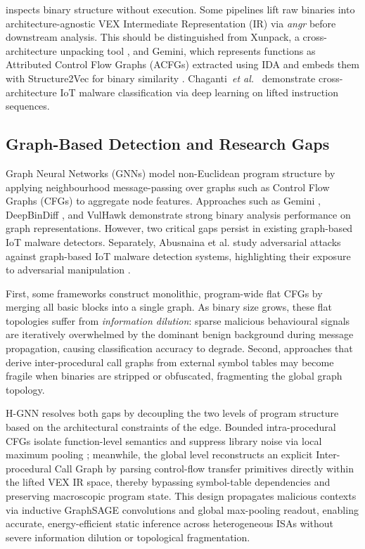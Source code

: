 \documentclass{llncs}
\begin{document}
 inspects binary structure without
execution. Some pipelines lift raw binaries into architecture-agnostic
VEX Intermediate Representation (IR) via \textit{angr} before downstream
analysis.
This should be distinguished from Xunpack, a cross-architecture
unpacking tool \cite{b4}, and Gemini, which represents functions as
Attributed Control Flow Graphs (ACFGs) extracted using IDA and embeds them
with Structure2Vec for binary similarity \cite{b8}.
Chaganti~\textit{et al.}~\cite{b5} demonstrate cross-architecture
IoT malware classification via deep learning on lifted instruction
sequences.

\subsection{Graph-Based Detection and Research Gaps}

Graph Neural Networks (GNNs) model non-Euclidean program
structure by applying neighbourhood message-passing over graphs such as
Control Flow Graphs (CFGs) to aggregate node features.
Approaches such as Gemini \cite{b8}, DeepBinDiff \cite{b9}, and VulHawk
\cite{b10} demonstrate strong binary analysis performance on
graph representations. However, two critical gaps persist
in existing graph-based IoT malware detectors.
Separately, Abusnaina et al. study adversarial attacks against
graph-based IoT malware detection systems, highlighting their exposure to
adversarial manipulation \cite{b6}.

First, some frameworks construct monolithic, program-wide
flat CFGs by merging all basic blocks into a single graph.
As binary size grows, these flat topologies suffer
from \textit{information dilution}: sparse malicious
behavioural signals are iteratively overwhelmed by the
dominant benign background during message propagation, causing
classification accuracy to degrade. Second, approaches that derive
inter-procedural call graphs from external symbol tables may become fragile
when binaries are stripped or obfuscated, fragmenting the global graph
topology.

H-GNN resolves both gaps by decoupling the two levels of program structure based 
on the architectural constraints of the edge. Bounded intra-procedural CFGs isolate 
function-level semantics and suppress library noise via local maximum pooling \cite{b6}; 
meanwhile, the global level reconstructs an explicit Inter-procedural Call Graph 
by parsing control-flow transfer primitives directly within the lifted VEX IR space, 
thereby bypassing symbol-table dependencies and preserving macroscopic program state. 
This design propagates malicious contexts via inductive GraphSAGE convolutions and 
global max-pooling readout, enabling accurate, energy-efficient static inference 
across heterogeneous ISAs without severe information dilution or topological fragmentation.
\end{document}
